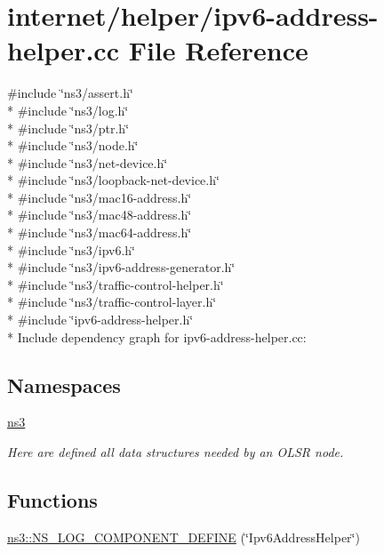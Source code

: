 \hypertarget{ipv6-address-helper_8cc}{}\section{internet/helper/ipv6-\/address-\/helper.cc File Reference}
\label{ipv6-address-helper_8cc}
{\ttfamily \#include \char`\"{}ns3/assert.\+h\char`\"{}}\\*
{\ttfamily \#include \char`\"{}ns3/log.\+h\char`\"{}}\\*
{\ttfamily \#include \char`\"{}ns3/ptr.\+h\char`\"{}}\\*
{\ttfamily \#include \char`\"{}ns3/node.\+h\char`\"{}}\\*
{\ttfamily \#include \char`\"{}ns3/net-\/device.\+h\char`\"{}}\\*
{\ttfamily \#include \char`\"{}ns3/loopback-\/net-\/device.\+h\char`\"{}}\\*
{\ttfamily \#include \char`\"{}ns3/mac16-\/address.\+h\char`\"{}}\\*
{\ttfamily \#include \char`\"{}ns3/mac48-\/address.\+h\char`\"{}}\\*
{\ttfamily \#include \char`\"{}ns3/mac64-\/address.\+h\char`\"{}}\\*
{\ttfamily \#include \char`\"{}ns3/ipv6.\+h\char`\"{}}\\*
{\ttfamily \#include \char`\"{}ns3/ipv6-\/address-\/generator.\+h\char`\"{}}\\*
{\ttfamily \#include \char`\"{}ns3/traffic-\/control-\/helper.\+h\char`\"{}}\\*
{\ttfamily \#include \char`\"{}ns3/traffic-\/control-\/layer.\+h\char`\"{}}\\*
{\ttfamily \#include \char`\"{}ipv6-\/address-\/helper.\+h\char`\"{}}\\*
Include dependency graph for ipv6-\/address-\/helper.cc\+:
\subsection*{Namespaces}
\begin{DoxyCompactItemize}
\item 
 \hyperlink{namespacens3}{ns3}
\begin{DoxyCompactList}\small\item\em Here are defined all data structures needed by an O\+L\+SR node. \end{DoxyCompactList}\end{DoxyCompactItemize}
\subsection*{Functions}
\begin{DoxyCompactItemize}
\item 
\hyperlink{namespacens3_ac0a9bacb167bf7f93c07bb3de3073279}{ns3\+::\+N\+S\+\_\+\+L\+O\+G\+\_\+\+C\+O\+M\+P\+O\+N\+E\+N\+T\+\_\+\+D\+E\+F\+I\+NE} (\char`\"{}Ipv6\+Address\+Helper\char`\"{})
\end{DoxyCompactItemize}
